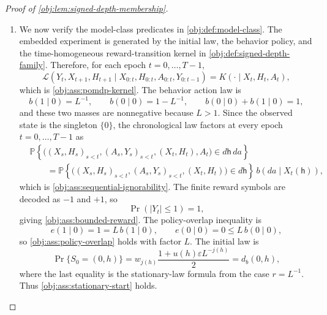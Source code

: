 \begin{proof}[Proof of \cref{obj:lem:signed-depth-membership}]
\begin{enumerate}
\item We now verify the model-class predicates in \cref{obj:def:model-class}.
The embedded experiment is generated by the initial law, the behavior policy,
and the time-homogeneous reward-transition kernel in
\cref{obj:def:signed-depth-family}.  Therefore, for each epoch
\(t=0,\ldots,T-1\),
\[
\mathcal L(Y_t,X_{t+1},H_{t+1}\mid X_{0:t},H_{0:t},A_{0:t},Y_{0:t-1})
=
K(\cdot\mid X_t,H_t,A_t),
\]
which is \cref{obj:ass:pomdp-kernel}.  The behavior action law is
\[
b(1\mid0)=L^{-1},
\qquad
b(0\mid0)=1-L^{-1},
\qquad
b(0\mid0)+b(1\mid0)=1,
\]
and these two masses are nonnegative because \(L>1\).  Since the observed
state is the singleton \(\{0\}\), the chronological law factors at every epoch
\(t=0,\ldots,T-1\) as
\[
\begin{aligned}
&\mathbb P\!\left\{
\bigl((X_s,H_s)_{s<t},(A_s,Y_s)_{s<t},(X_t,H_t),A_t\bigr)
\in d\mathsf h\,da
\right\} \\
&\qquad=
\mathbb P\!\left\{
\bigl((X_s,H_s)_{s<t},(A_s,Y_s)_{s<t},(X_t,H_t)\bigr)
\in d\mathsf h
\right\}\,b(da\mid X_t(\mathsf h)),
\end{aligned}
\]
which is \cref{obj:ass:sequential-ignorability}.  The finite reward symbols are
decoded as \(-1\) and \(+1\), so
\[
\Pr(|Y_t|\le1)=1,
\]
giving \cref{obj:ass:bounded-reward}.  The policy-overlap inequality is
\[
e(1\mid0)=1=L\,b(1\mid0),
\qquad
e(0\mid0)=0\le L\,b(0\mid0),
\]
so \cref{obj:ass:policy-overlap} holds with factor \(L\).  The initial law is
\[
\Pr\{S_0=(0,h)\}
=
w_{j(h)}
\frac{1+u(h)\varepsilon L^{-j(h)}}2
=
d_b(0,h),
\]
where the last equality is the stationary-law formula from the case
\(r=L^{-1}\).  Thus \cref{obj:ass:stationary-start} holds.


\end{enumerate}
\end{proof}
